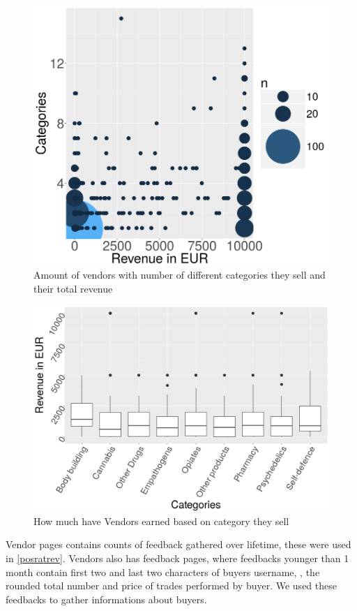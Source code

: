\documentclass[
  digital, %
  table,   %
  lof,     %
  lot,     %
  oneside
]{fithesis3}
\begin{document}
\begin{figure}[!htb]
    \centering
    \includegraphics[scale=0.4]{catxrev}
    \caption{Amount of vendors with number of different categories they sell and their total revenue}
    \label{catxrev}
\end{figure}

\begin{figure}[!htb]
    \centering
    \includegraphics[scale=0.4]{boxcat}
    \caption{How much have Vendors earned based on category they sell}
    \label{boxcat}
\end{figure}


Vendor pages contains counts of feedback gathered over lifetime, these were used
in \ref{posratrev}. Vendors also has feedback pages, where feedbacks younger than
1 month contain first two and last two characters of buyers username,
, the rounded total number and price of trades performed by buyer.
We used these feedbacks to gather informations about buyers.
\end{document}
